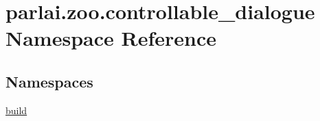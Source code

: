 \hypertarget{namespaceparlai_1_1zoo_1_1controllable__dialogue}{}\section{parlai.\+zoo.\+controllable\+\_\+dialogue Namespace Reference}
\label{namespaceparlai_1_1zoo_1_1controllable__dialogue}
\subsection*{Namespaces}
\begin{DoxyCompactItemize}
\item 
 \hyperlink{namespaceparlai_1_1zoo_1_1controllable__dialogue_1_1build}{build}
\end{DoxyCompactItemize}
